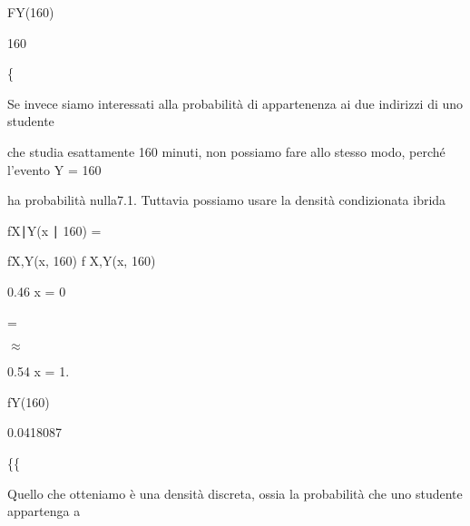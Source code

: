\documentclass[a4paper,portrait,12pt]{article}
\begin{document}
\begin{flushleft}
FY(160)
\end{flushleft}


160





\{





\begin{flushleft}
Se invece siamo interessati alla probabilit\`{a} di appartenenza ai due indirizzi di uno studente
\end{flushleft}


\begin{flushleft}
che studia esattamente 160 minuti, non possiamo fare allo stesso modo, perch\'{e} l'evento Y = 160
\end{flushleft}


\begin{flushleft}
ha probabilit\`{a} nulla7.1. Tuttavia possiamo usare la densit\`{a} condizionata ibrida
\end{flushleft}


\begin{flushleft}
fX∣Y(x ∣ 160) =
\end{flushleft}





\begin{flushleft}
fX,Y(x, 160) f X,Y(x, 160)
\end{flushleft}


\begin{flushleft}
0.46 x = 0
\end{flushleft}


=


$\approx$


\begin{flushleft}
0.54 x = 1.
\end{flushleft}


\begin{flushleft}
fY(160)
\end{flushleft}


0.0418087





\{\{





\begin{flushleft}
Quello che otteniamo \`{e} una densit\`{a} discreta, ossia la probabilit\`{a} che uno studente appartenga a
\end{flushleft}
\end{document}
